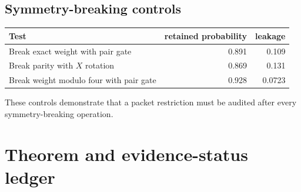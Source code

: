 \subsection{Symmetry-breaking controls}
\begin{center}
\begin{tabular}{@{}lrr@{}}
\toprule
Test & retained probability & leakage\\
\midrule
Break exact weight with pair gate & 0.891 & 0.109\\
Break parity with $X$ rotation & 0.869 & 0.131\\
Break weight modulo four with pair gate & 0.928 & 0.0723\\
\bottomrule
\end{tabular}
\end{center}

These controls demonstrate that a packet restriction must be audited after every symmetry-breaking operation.

\section{Theorem and evidence-status ledger}
\label{s:app:status}

